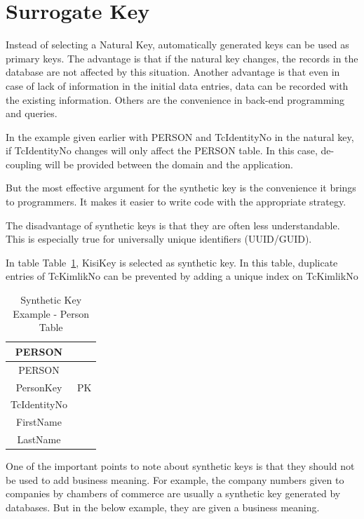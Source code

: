 \documentclass[
  letterpaper,
  DIV=11,
  numbers=noendperiod]{scrreprt}
\begin{document}
\section{Surrogate Key}\label{surrogate-key}

Instead of selecting a Natural Key, automatically generated keys can be
used as primary keys. The advantage is that if the natural key changes,
the records in the database are not affected by this situation. Another
advantage is that even in case of lack of information in the initial
data entries, data can be recorded with the existing information. Others
are the convenience in back-end programming and queries.

In the example given earlier with PERSON and TcIdentityNo in the natural
key, if TcIdentityNo changes will only affect the PERSON table. In this
case, de-coupling will be provided between the domain and the
application.

But the most effective argument for the synthetic key is the convenience
it brings to programmers. It makes it easier to write code with the
appropriate strategy.

The disadvantage of synthetic keys is that they are often less
understandable. This is especially true for universally unique
identifiers (UUID/GUID).

In table
Table~\ref{tbl-table-primary-key-synthetic-key-sample-person-table},
KisiKey is selected as synthetic key. In this table, duplicate entries
of TcKimlikNo can be prevented by adding a unique index on TcKimlikNo

\begin{longtable}[]{@{}cc@{}}
\caption{Synthetic Key Example - Person
Table}\label{tbl-table-primary-key-synthetic-key-sample-person-table}\tabularnewline
\toprule\noalign{}
PERSON & \\
\midrule\noalign{}
\endfirsthead
\toprule\noalign{}
PERSON & \\
\midrule\noalign{}
\endhead
\bottomrule\noalign{}
\endlastfoot
PersonKey & PK \\
TcIdentityNo & \\
FirstName & \\
LastName & \\
\end{longtable}

One of the important points to note about synthetic keys is that they
should not be used to add business meaning. For example, the company
numbers given to companies by chambers of commerce are usually a
synthetic key generated by databases. But in the below example, they are
given a business meaning.
\end{document}
